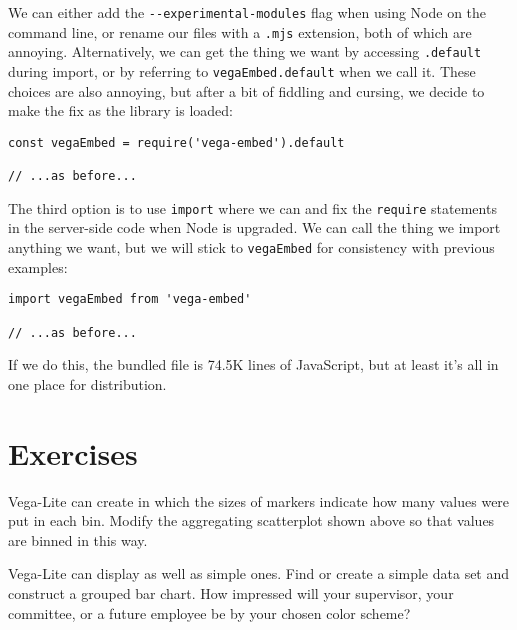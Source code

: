 We can either add the \texttt{-\/-experimental-modules} flag when using Node on the command line,
or rename our files with a \texttt{.mjs} extension,
both of which are annoying.
Alternatively,
we can get the thing we want by accessing \texttt{.default} during import,
or by referring to \texttt{vegaEmbed.default} when we call it.
These choices are also annoying,
but after a bit of fiddling and cursing,
we decide to make the fix as the library is loaded:

\begin{verbatim}
const vegaEmbed = require('vega-embed').default

// ...as before...
\end{verbatim}

The third option is to use \texttt{import} where we can
and fix the \texttt{require} statements in the server-side code when Node is upgraded.
We can call the thing we import anything we want,
but we will stick to \texttt{vegaEmbed} for consistency with previous examples:

\begin{verbatim}
import vegaEmbed from 'vega-embed'

// ...as before...
\end{verbatim}

\noindent
If we do this,
the bundled file is 74.5K lines of JavaScript,
but at least it's all in one place for distribution.

\section{Exercises}\label{s:vis-exercises}


Vega-Lite can create
in which the sizes of markers indicate how many values were put in each bin.
Modify the aggregating scatterplot shown above
so that values are binned in this way.


Vega-Lite can display
as well as simple ones.
Find or create a simple data set and construct a grouped bar chart.
How impressed will your supervisor, your committee, or a future employee be
by your chosen color scheme?



